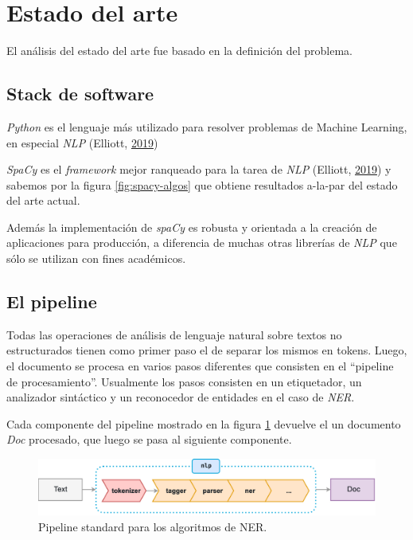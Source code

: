 \documentclass[12pt,a4paper,]{scrartcl}
\begin{document}
\newpage

\hypertarget{state-of-art}{%
\section{Estado del arte}\label{state-of-art}}

El análisis del estado del arte fue basado en la definición del problema.

\hypertarget{stack-de-software}{%
\subsection{Stack de software}\label{stack-de-software}}

\emph{Python} es el lenguaje más utilizado para resolver problemas de Machine Learning, en especial \emph{NLP} (Elliott, \protect\hyperlink{ref-github_machine_learning}{2019})

\emph{SpaCy} es el \emph{framework} mejor ranqueado para la tarea de \emph{NLP} (Elliott, \protect\hyperlink{ref-github_machine_learning}{2019}) y sabemos por la figura \ref{fig:spacy-algos} que obtiene resultados a-la-par del estado del arte actual.

Además la implementación de \emph{spaCy} es robusta y orientada a la creación de aplicaciones para producción, a diferencia de muchas otras librerías de \emph{NLP} que sólo se utilizan con fines académicos.

\hypertarget{el-pipeline}{%
\subsection{El pipeline}\label{el-pipeline}}

Todas las operaciones de análisis de lenguaje natural sobre textos no estructurados tienen como primer paso el de separar los mismos en tokens. Luego, el documento se procesa en varios pasos diferentes que consisten en el \enquote{pipeline de procesamiento}. Usualmente los pasos consisten en un etiquetador, un analizador sintáctico y un reconocedor de entidades en el caso de \emph{NER}.

Cada componente del pipeline mostrado en la figura \ref{fig:spacy-pipeline} devuelve el un documento \emph{Doc} procesado, que luego se pasa al siguiente componente.

\begin{figure}[H]

{\centering \includegraphics{assets/spacy_pipeline.pdf} 

}

\caption{Pipeline standard para los algoritmos de NER.}\label{fig:spacy-pipeline}
\end{figure}
\end{document}
